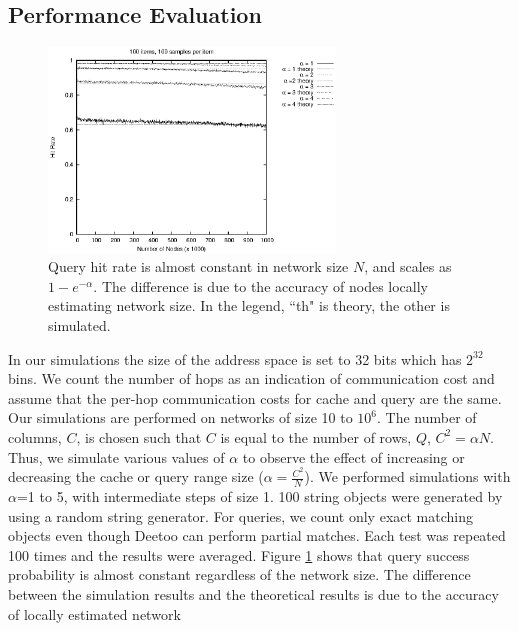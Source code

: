 \documentclass[conference]{IEEEtran}
\begin{document}
\subsection{Performance Evaluation} 
\begin{figure}
\centering
\includegraphics[width=3in]{th_hitrate1}
\caption{Query hit rate is almost constant in network size $N$, and scales
as $1-e^{-\alpha}$. The difference is due to the accuracy of nodes locally 
estimating network size. In the legend, ``th" is theory, the other is simulated.} \label{fig:hitrate}
\end{figure}
In our simulations the size of the address space is set to 32 bits which has $2^{32}$
bins. 
We count the number of hops as an indication of communication cost and assume that the 
per-hop communication costs for cache and query are the same. 
Our simulations are performed on networks of size 10 to $10^{6}$.
The number of columns, $C$, is chosen such that $C$ is equal to the number of rows, $Q$, 
$C^2 = \alpha N$. Thus, we simulate various values of $\alpha$ to observe the effect of
increasing or decreasing the cache or query range size ($\alpha=\frac{C^2}{N}$). 
We performed simulations with $\alpha$=1 to 5, with intermediate steps of size 1.
100 string objects were generated by using a random string generator.
For queries, we count only exact matching objects even though Deetoo can perform partial matches.
Each test was repeated 100 times and the results were averaged. 
Figure \ref{fig:hitrate} shows that query success probability is almost constant 
regardless of the network size. The difference between the simulation results and 
the theoretical results is due to the accuracy of locally estimated network
\end{document}
